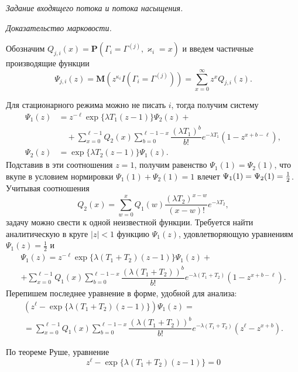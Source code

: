 \documentclass[10pt,oneside,final]{book}
\renewcommand{\Pr}{{\mathbf P}}
\newcommand{\M}{{\mathbf M}}
\newcommand*{\hm}[1]{#1\nobreak\discretionary{}%
  {\hbox{$\mathsurround=0pt #1$}}{}}
\begin{document}
\medskip

\textsl{Задание входящего потока и потока насыщения.}

\smallskip

\textsl{Доказательство марковости.}

\medskip

Обозначим $Q_{j,i}(x)=\Pr(\Gamma_i=\Gamma^{(j)}, \varkappa_i=x)$ и введем
частичные производящие функции 
\[
\Psi_{j,i}(z)=\M(z^{\kappa_i}I(\Gamma_i=\Gamma^{(j)}))=\sum_{x=0}^\infty z^x
Q_{j,i}(z).
\]

Для стационарного режима можно не писать $i$, тогда получим систему
\begin{align*}
  \Psi_1(z) & = z^{-\ell}\exp\{\lambda T_1(z-1)\} \Psi_2(z)+
  \\ & \quad + 
  \sum_{x=0}^{\ell-1}
  Q_2(x)\sum_{b=0}^{\ell-1-x} \dfrac{(\lambda T_1)^b}{b!}e^{-\lambda T_1}
  (1-z^{x+b-\ell}),\\
  \Psi_2(z) & = \exp\{ \lambda T_2(z-1)\}\Psi_1(z).
\end{align*}
Подставив в эти соотношения $z=1$, получим равенство $\Psi_1(1)=\Psi_2(1)$, что
вкупе в условием нормировки $\Psi_1(1)+\Psi_2(1)=1$ влечет
$\Psi_1(1)\hm=\Psi_2(1)\hm=\frac12$.  Учитывая соотношения
\[
Q_2(x) = \sum_{w=0}^x Q_1(w) \dfrac{(\lambda T_2)^{x-w}}{(x-w)!}e^{-\lambda T_2},
\]
задачу можно свести к одной неизвестной функции. Требуется найти аналитическую в
круге $|z|<1$ функцию $\Psi_1(z)$, удовлетворяющую уравнениям $\Psi_1(z)=
\frac12$ и 
\begin{multline*}
  \Psi_1(z)  = z^{-\ell}\exp\{\lambda (T_1+T_2)(z-1)\} \Psi_1(z)+
  \\  + 
  \sum_{x=0}^{\ell-1}
  Q_1(x)\sum_{b=0}^{\ell-1-x} \dfrac{(\lambda (T_1+T_2))^b}{b!}e^{-\lambda (T_1+T_2)}
  (1-z^{x+b-\ell}).
\end{multline*}
Перепишем последнее уравнение в форме, удобной для анализа:
\begin{multline}
  \label{eq:Psi-main}
  (z^{\ell} - \exp\{\lambda (T_1+T_2)(z-1)\})\Psi_1(z) =
  \\ =
  \sum_{x=0}^{\ell-1}
  Q_1(x)\sum_{b=0}^{\ell-1-x} \dfrac{(\lambda (T_1+T_2))^b}{b!}e^{-\lambda (T_1+T_2)}
  (z^\ell-z^{x+b}). 
\end{multline}

По теореме Руше, уравнение 
\begin{equation}
z^{\ell} - \exp\{\lambda (T_1+T_2)(z-1)\}=0
\label{eq:main-walk-kern}
\end{equation}
\end{document}
